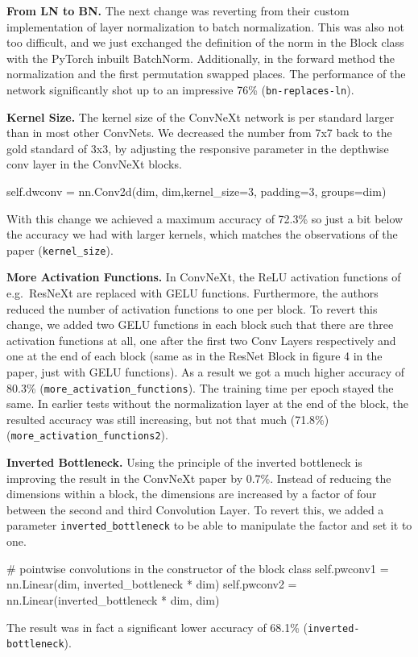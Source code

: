 \documentclass{article}
\begin{document}
\textbf{From LN to BN.} %
The next change was reverting from their custom implementation of layer normalization to batch normalization.
This was also not too difficult, and we just exchanged the definition of the norm in the Block class with the PyTorch inbuilt BatchNorm.
Additionally, in the forward method the normalization and the first permutation swapped places.
The performance of the network significantly shot up to an impressive 76\% (\texttt{bn-replaces-ln}).

\textbf{Kernel Size.} %
The kernel size of the ConvNeXt network is per standard larger than in most other ConvNets.
We decreased the number from 7x7 back to the gold standard of 3x3, by adjusting the responsive parameter in the depthwise conv layer in the ConvNeXt blocks.
\begin{python}
self.dwconv = nn.Conv2d(dim, dim,kernel_size=3, padding=3, groups=dim)
\end{python}
With this change we achieved a maximum accuracy of 72.3\% so just a bit below the accuracy we had with larger kernels, which matches the observations of the paper (\texttt{kernel\_size}).

\textbf{More Activation Functions.} %
In ConvNeXt, the ReLU activation functions of e.g.\ ResNeXt are replaced with GELU functions.
Furthermore, the authors reduced the number of activation functions to one per block.
To revert this change, we added two GELU functions in each block such that there are three activation functions at all, one after the first two Conv Layers respectively and one at the end of each block (same as in the ResNet Block in figure 4 in the paper, just with GELU functions).
As a result we got a much higher accuracy of 80.3\% (\texttt{more\_activation\_functions}).
The training time per epoch stayed the same.
In earlier tests without the normalization layer at the end of the block, the resulted accuracy was still increasing, but not that much (71.8\%) (\texttt{more\_activation\_functions2}).

\textbf{Inverted Bottleneck.} %
Using the principle of the inverted bottleneck is improving the result in the ConvNeXt paper by 0.7\%.
Instead of reducing the dimensions within a block, the dimensions are increased by a factor of four between the second and third Convolution Layer.
To revert this, we added a parameter \texttt{inverted\_bottleneck}
to be able to manipulate the factor and set it to one.
\begin{python}
# pointwise convolutions in the constructor of the block class
self.pwconv1 = nn.Linear(dim, inverted_bottleneck * dim)
self.pwconv2 = nn.Linear(inverted_bottleneck * dim, dim)
\end{python}
The result was in fact a significant lower accuracy of 68.1\% (\texttt{inverted-bottleneck}).
\end{document}
